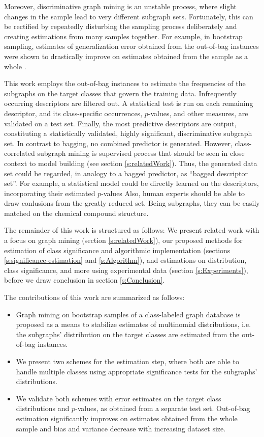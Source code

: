 \documentclass{article}
\begin{document}
Moreover, discriminative graph mining is an unstable process, where slight
changes in the sample lead to very different subgraph sets. Fortunately, this
can be rectified by repeatedly disturbing the sampling process deliberately and
creating estimations from many samples together. For example, in bootstrap
sampling, estimates of generalization error obtained from the out-of-bag
instances were shown to drastically improve on estimates obtained from the sample as a
whole \cite{bylander02estimating, breiman96oob}.

This work employs the out-of-bag instances to estimate the frequencies of the
subgraphs on the target classes that govern the training data. Infrequently
occurring descriptors are filtered out. A statistical test is run on each
remaining descriptor, and its class-specific occurrences, $p$-values, and other
measures, are validated on a test set. Finally, the most predictive descriptors
are output, constituting a statistically validated, highly significant,
discriminative subgraph set.  In contrast to bagging, no combined predictor is
generated.  However, class-correlated subgraph mining is supervised process
that should be seen in close context to model building (see section
\ref{s:relatedWork}). Thus, the generated data set could be regarded, in
analogy to a bagged predictor, as ``bagged descriptor set''. For example, a
statistical model could be directly learned on the descriptors, incorporating
their estimated $p$-values Also, human experts should be able to draw
conlusions from the greatly reduced set. Being subgraphs, they can be easily
matched on the chemical compound structure.

The remainder of this work is structured as follows: We present related work with a focus on graph mining
(section \ref{s:relatedWork}), our proposed methods for estimation of class significance
and algorithmic implementation (sections \ref{s:significance-estimation} and
\ref{s:Algorithm}), and estimations on distribution, class significance, and more using experimental data (section \ref{s:Experiments}), before we draw
conclusion in section \ref{s:Conclusion}.

The contributions of this work are summarized as follows:
\begin{itemize}
  \item Graph mining on bootstrap samples of a class-labeled graph database is
    proposed as a means to stabilize estimates of multinomial distributions,
    i.e. the subgraphs' distribution on the target classes are estimated
    from the out-of-bag instances.
  \item We present two schemes for the estimation step, where both are
    able to handle multiple classes using appropriate significance tests for
    the subgraphs' distributions. 
  \item We validate both schemes with error estimates on the target class
    distributions and $p$-values, as obtained from a separate test set.
    Out-of-bag estimation significantly improves on estimates obtained from the
    whole sample and bias and variance decrease with increasing dataset size.
\end{itemize}
\end{document}
